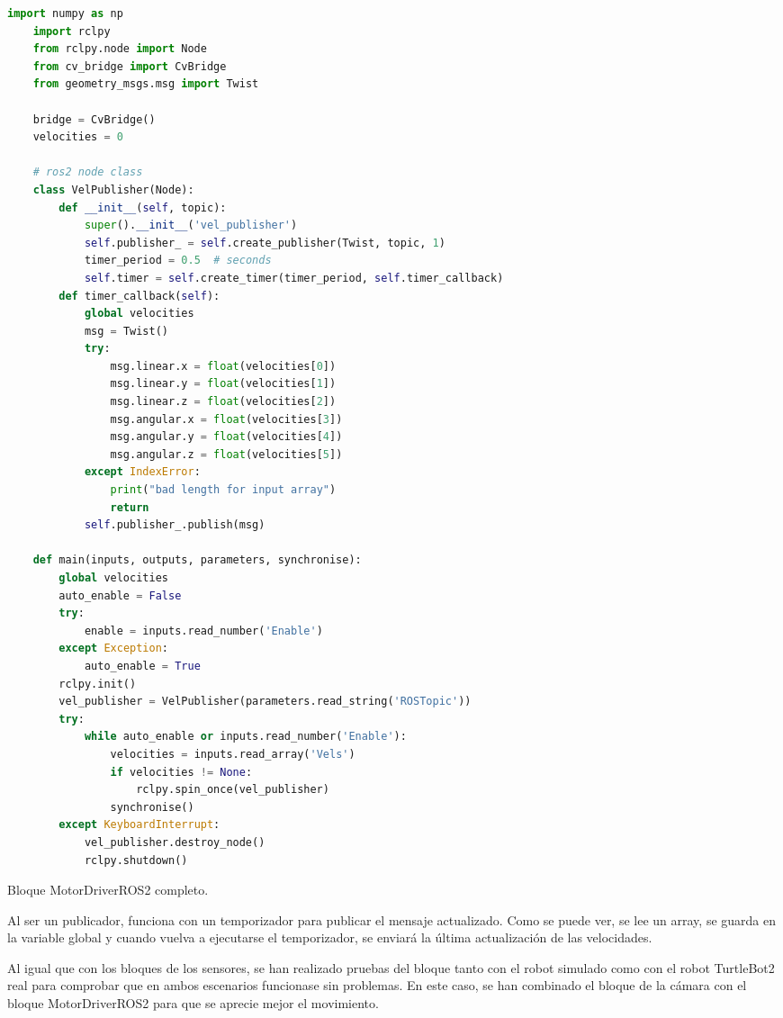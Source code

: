 \begin{code}[H]
  \begin{lstlisting}[language=python]
    import numpy as np
    import rclpy
    from rclpy.node import Node
    from cv_bridge import CvBridge
    from geometry_msgs.msg import Twist

    bridge = CvBridge()
    velocities = 0

    # ros2 node class
    class VelPublisher(Node):
        def __init__(self, topic):
            super().__init__('vel_publisher')
            self.publisher_ = self.create_publisher(Twist, topic, 1)
            timer_period = 0.5  # seconds
            self.timer = self.create_timer(timer_period, self.timer_callback)
        def timer_callback(self):
            global velocities
            msg = Twist()
            try:
                msg.linear.x = float(velocities[0])
                msg.linear.y = float(velocities[1])
                msg.linear.z = float(velocities[2])
                msg.angular.x = float(velocities[3])
                msg.angular.y = float(velocities[4])
                msg.angular.z = float(velocities[5])
            except IndexError:
                print("bad length for input array")
                return
            self.publisher_.publish(msg)

    def main(inputs, outputs, parameters, synchronise):
        global velocities
        auto_enable = False
        try:
            enable = inputs.read_number('Enable')
        except Exception:
            auto_enable = True
        rclpy.init()
        vel_publisher = VelPublisher(parameters.read_string('ROSTopic'))
        try:
            while auto_enable or inputs.read_number('Enable'):
                velocities = inputs.read_array('Vels')
                if velocities != None:
                    rclpy.spin_once(vel_publisher)
                synchronise()
        except KeyboardInterrupt:
            vel_publisher.destroy_node()
            rclpy.shutdown()
  \end{lstlisting}
  \caption[Bloque MotorDriverROS2]{Bloque MotorDriverROS2 completo.}
  \label{cod:motordriverros2_all}
\end{code}

Al ser un publicador, funciona con un temporizador para publicar el mensaje actualizado. Como se puede ver, se lee un array, se guarda en
la variable global y cuando vuelva a ejecutarse el temporizador, se enviará la última actualización de las velocidades.

Al igual que con los bloques de los sensores, se han realizado pruebas del bloque tanto con el robot simulado como con el robot TurtleBot2 real
para comprobar que en ambos escenarios funcionase sin problemas. En este caso, se han combinado el bloque de la cámara con el bloque MotorDriverROS2
para que se aprecie mejor el movimiento.

